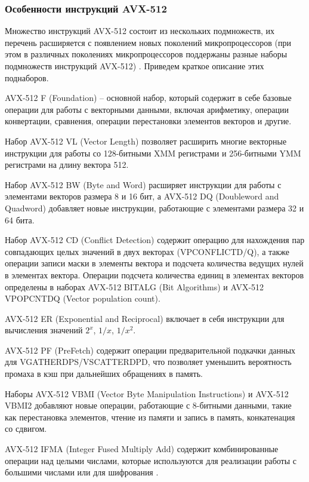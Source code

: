 \subsubsection{Особенности инструкций AVX-512}

Множество инструкций AVX-512 состоит из нескольких подмножеств, их перечень расширяется с появлением новых поколений микропроцессоров (при этом в различных поколениях микропроцессоров поддержаны разные наборы подмножеств инструкций AVX-512) \cite{IntelSDM2025}.
Приведем краткое описание этих поднаборов.

AVX-512 F (Foundation) -- основной набор, который содержит в себе базовые операции для работы с векторными данными, включая арифметику, операции конвертации, сравнения, операции перестановки элементов векторов и другие.

Набор AVX-512 VL (Vector Length) позволяет расширить многие векторные инструкции для работы со 128-битными XMM регистрами и 256-битными YMM регистрами на длину вектора 512.

Набор AVX-512 BW (Byte and Word) расширяет инструкции для работы с элементами векторов размера 8 и 16 бит, а AVX-512 DQ (Doubleword and Quadword) добавляет новые инструкции, работающие с элементами размера 32 и 64 бита.

Набор AVX-512 CD (Conflict Detection) содержит операцию для нахождения пар совпадающих целых значений в двух векторах (VPCONFLICTD/Q), а также операции записи маски в элементы вектора и подсчета количества ведущих нулей в элементах вектора.
Операции подсчета количества единиц в элементах векторов определены в наборах AVX-512 BITALG (Bit Algorithms) и AVX-512 VPOPCNTDQ (Vector population count).

AVX-512 ER (Exponential and Reciprocal) включает в себя инструкции для вычисления значений $2^x$, $1/x$, $1/{x^2}$.

AVX-512 PF (PreFetch) содержит операции предварительной подкачки данных для VGATHERDPS/VSCATTERDPD, что позволяет уменьшить вероятность промаха в кэш при дальнейших обращениях в память.

Наборы AVX-512 VBMI (Vector Byte Manipulation Instructions) и AVX-512 VBMI2 добавляют новые операции, работающие с 8-битными данными, такие как перестановка элементов, чтение из памяти и запись в память, конкатенация со сдвигом.

AVX-512 IFMA (Integer Fused Multiply Add) содержит комбинированные операции над целыми числами, которые используются для реализации работы с большими числами или для шифрования \cite{Edamatsu2023VecDiv}.

